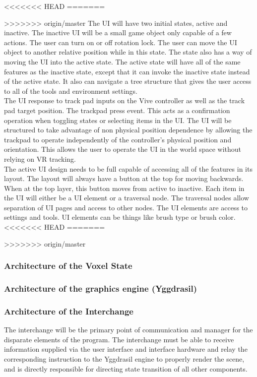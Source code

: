 \documentclass[onecolumn, draftclsnofoot,10pt, compsoc]{IEEEtran}
\begin{document}
<<<<<<< HEAD
=======

>>>>>>> origin/master
The UI will have two initial states, active and inactive. The inactive UI will be a small game object only capable of a few actions. The user can turn on or off rotation lock. The user can move the UI object to another relative position while in this state. The state also has a way of moving the UI into the active state. 
The active state will have all of the same features as the inactive state, except that it can invoke the inactive state instead of the active state. It also can navigate a tree structure that gives the user access to all of the tools and environment settings. \\

The UI response to track pad inputs on the Vive controller as well as the track pad target position. The trackpad press event. This acts as a confirmation operation when toggling states or selecting items in the UI. The UI will be structured to take advantage of non physical position dependence by allowing the trackpad to operate independently of the controller's physical position and orientation. This allows the user to operate the UI in the world space without relying on VR tracking. \\

The active UI design needs to be full capable of accessing all of the features in its layout. The layout will always have a button at the top for moving backwards. When at the top layer, this button moves from active to inactive. Each item in the UI will either be a UI element or a traversal node. The traversal nodes allow separation of UI pages and access to other nodes. The UI elements are access to settings and tools. UI elements can be things like brush type or brush color. \\

<<<<<<< HEAD
=======

>>>>>>> origin/master
\subsubsection{Architecture of the Voxel State}

\subsubsection{Architecture of the graphics engine (Yggdrasil)}

\subsubsection{Architecture of the Interchange}
The interchange will be the primary point of communication and manager for the disparate elements of the program. The interchange must be able to receive information supplied via the user interface and interface hardware and relay the corresponding instruction to the Yggdrasil engine to properly render the scene, and is directly responsible for directing state transition of all other components.
\end{document}
